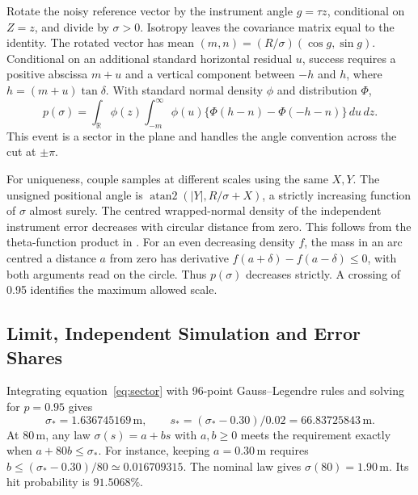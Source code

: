 \documentclass{swmcmthesis}
\begin{document}
Rotate the noisy reference vector by the instrument angle \(g=\tau z\), conditional on \(Z=z\), and divide by \(\sigma>0\). Isotropy leaves the covariance matrix equal to the identity. The rotated vector has mean \((m,n)=(R/\sigma)(\cos g,\sin g)\). Conditional on an additional standard horizontal residual \(u\), success requires a positive abscissa \(m+u\) and a vertical component between \(-h\) and \(h\), where \(h=(m+u)\tan\delta\). With standard normal density \(\phi\) and distribution \(\Phi\),
\begin{equation}
 p(\sigma)=\int_{\mathbb R}\!\phi(z)
 \int_{-m}^{\infty}\!\phi(u)
 \{\Phi(h-n)-\Phi(-h-n)\}\,du\,dz .
 \label{eq:sector}
\end{equation}
This event is a sector in the plane and handles the angle convention across the cut at \(\pm\pi\).

For uniqueness, couple samples at different scales using the same \(X,Y\). The unsigned positional angle is \(\operatorname{atan2}(|Y|,R/\sigma+X)\), a strictly increasing function of \(\sigma\) almost surely. The centred wrapped-normal density of the independent instrument error decreases with circular distance from zero. This follows from the theta-function product in \cite{theta}. For an even decreasing density \(f\), the mass in an arc centred a distance \(a\) from zero has derivative \(f(a+\delta)-f(a-\delta)\leq0\), with both arguments read on the circle. Thus \(p(\sigma)\) decreases strictly. A crossing of 0.95 identifies the maximum allowed scale.

\clearpage
\subsection{Limit, Independent Simulation and Error Shares}
Integrating equation~\eqref{eq:sector} with 96-point Gauss--Legendre rules and solving for \(p=0.95\) gives
\begin{equation}
 \sigma_* = 1.636745169\,\mathrm m,\qquad
 s_*=(\sigma_*-0.30)/0.02=66.83725843\,\mathrm m .
\end{equation}
At 80\,m, any law \(\sigma(s)=a+bs\) with \(a,b\geq0\) meets the requirement exactly when \(a+80b\leq\sigma_*\). For instance, keeping \(a=0.30\,\mathrm m\) requires \(b\leq(\sigma_*-0.30)/80\simeq0.016709315\). The nominal law gives \(\sigma(80)=1.90\,\mathrm m\). Its hit probability is \(91.5068\%\).
\end{document}
